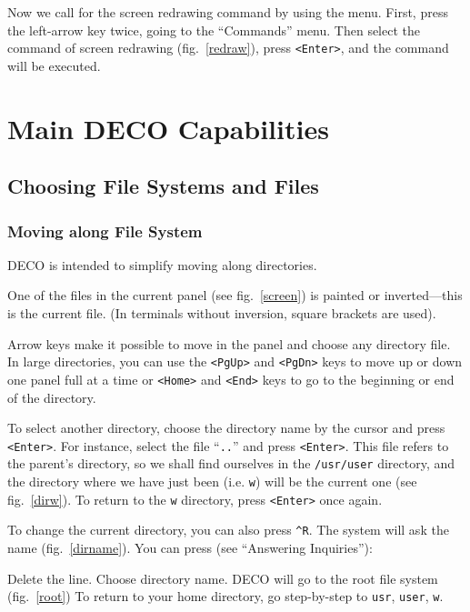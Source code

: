 Now we call for the screen redrawing command by using
the menu. First, press the left-arrow key twice, going to
the ``Commands'' menu. Then select the command of
screen redrawing (fig.~\ref{redraw}), press {\tt <Enter>}, and the
command will be executed.


\section{Main DECO Capabilities}

\subsection{Choosing File Systems and Files}

\subsubsection{Moving along File System}

DECO is intended to simplify moving along directories. 

One of the files in the current panel (see fig.~\ref{screen}) is
painted or inverted---this is the current file. (In terminals
without inversion, square brackets are used).

Arrow keys make it possible to move in the panel and choose any
directory file. In large directories, you can use the 
{\tt <PgUp>} and {\tt <PgDn>} keys to move up or down one panel full
at a time or {\tt <Home>} and {\tt <End>} keys to go to the
beginning or end of the directory.

To select another directory, choose the directory name 
by the cursor and press {\tt <Enter>}. For instance, select
the file ``{\tt ..}'' and press {\tt <Enter>}. This file refers to the
parent's directory, so we shall find ourselves in the 
{\tt /usr/user} directory, and the directory where we have
just been (i.e. {\tt w}) will be the current one (see fig.~\ref{dirw}). To
return to the {\tt w} directory, press {\tt <Enter>} once again.


To change the current directory, you can also press {\tt \^{}R}.
The system will ask the name (fig.~\ref{dirname}).
You can press (see ``Answering Inquiries''):
\begin{example}
Delete the line.
\litem{{\tt /}}
Choose directory name.
DECO will go to the root file system (fig.~\ref{root})
To return to your home directory, go step-by-step to
{\tt usr}, {\tt user}, {\tt w}.
\end{example}


